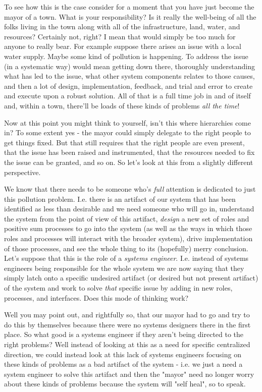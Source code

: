 \documentclass[11pt,a5paper]{book}
\begin{document}
To see how this is the case consider for a moment that you have just become the mayor of a town. What is your responsibility? Is it really the well-being of all the folks living in the town along with all of the infrastructure, land, water, and resources? Certainly not, right? I mean that would simply be too much for anyone to really bear. For example suppose there arises an issue with a local water supply. Maybe some kind of pollution is happening. To address the issue (in a systematic way) would mean getting down there, thoroughly understanding what has led to the issue, what other system components relates to those causes, and then a lot of design, implementation, feedback, and trial and error to create and execute upon a robust solution. All of that is a full time job in and of itself and, within a town, there'll be loads of these kinds of problems \textit{all the time}!
\newline

Now at this point you might think to yourself, isn't this where hierarchies come in? To some extent yes - the mayor could simply delegate to the right people to get things fixed. But that still requires that the right people are even present, that the issue has been raised and instrumented, that the resources needed to fix the issue can be granted, and so on. So let's look at this from a slightly different perspective. 
\newline

We know that there needs to be someone who's \textit{full} attention is dedicated to just this pollution problem. I.e. there is an artifact of our system that has been identified as less than desirable and we need someone who will go in, understand the system from the point of view of this artifact, \textit{design} a new set of roles and positive sum processes to go into the system (as well as the ways in which those roles and processes will interact with the broader system), drive implementation of those processes, and see the whole thing to its (hopefully) merry conclusion. Let's suppose that this is the role of a \textit{systems engineer}. I.e. instead of systems engineers being responsible for the whole system we are now saying that they simply latch onto a specific undesired artifact (or desired but not present artifact) of the system and work to solve \textit{that} specific issue by adding in new roles, processes, and interfaces. Does this mode of thinking work?
\newline

Well you may point out, and rightfully so, that our mayor had to go and try to do this by themselves because there were no systems designers there in the first place. So what good is a systems engineer if they aren't being directed to the right problems? Well instead of looking at this as a need for specific centralized direction, we could instead look at this lack of systems engineers focusing on these kinds of problems as a bad artifact of the system - i.e. we just a need a system engineer to solve this artifact and then the "mayor" need no longer worry about these kinds of problems because the system will "self heal", so to speak. 
\newline
\end{document}
